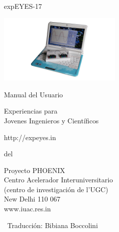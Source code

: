 \documentclass[12pt,a4paper]{report}
\begin{document}
\begin{titlepage}
\thispagestyle{empty}

\vspace{0.2in}

\begin{center}
{\Huge{}expEYES-17}
\par\end{center}{\Huge \par}

\begin{center}
\includegraphics[width=6cm]{../../pics/eyes17-nb}
\par\end{center}

\begin{center}
{\large{}Manual del Usuario}
\par\end{center}{\large \par}

\begin{center}
{\LARGE{}Experiencias para}\\
{\LARGE{}Jovenes Ingenieros y Científicos}
\par\end{center}{\LARGE \par}

\begin{center}
http://expeyes.in
\par\end{center}

\begin{center}
del
\par\end{center}

\begin{center}
Proyecto PHOENIX\\
Centro Acelerador Interuniversitario \\
(centro de investigación de l'UGC)\\
New Delhi 110 067\\
www.iuac.res.in
\par\end{center}

\vfill

{~\hfill \small Traducción: Bibiana Boccolini}

\end{titlepage}
\end{document}
